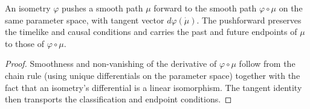 \begin{lemma}
    \label{lmm:pushforward-path}
    \leanok
    An isometry $\varphi$ pushes a smooth path $\mu$ forward to the smooth path $\varphi \circ \mu$ on the same parameter space, with tangent vector $d\varphi(\dot\mu)$. The pushforward preserves the timelike and causal conditions and carries the past and future endpoints of $\mu$ to those of $\varphi \circ \mu$.
\end{lemma}
\begin{proof}
    \leanok
    Smoothness and non-vanishing of the derivative of $\varphi \circ \mu$ follow from the chain rule (using unique differentials on the parameter space) together with the fact that an isometry's differential is a linear isomorphism. The tangent identity then transports the classification and endpoint conditions.
\end{proof}

